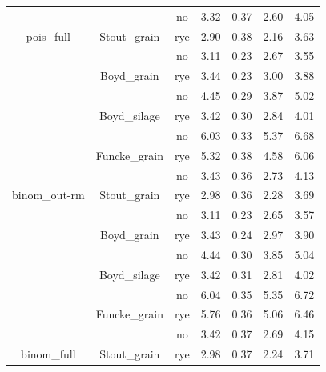 \documentclass[]{article}
\begin{document}
\begin{table}[H]
\begin{tabular}[t]{ccccccc}
\rowcolor{gray!6}   &  & no & 3.32 & 0.37 & 2.60 & 4.05\\

\multirow{-8}{*}{\centering\arraybackslash pois\_full} & \multirow{-2}{*}{\centering\arraybackslash Stout\_grain} & rye & 2.90 & 0.38 & 2.16 & 3.63\\
\cmidrule{1-7}
\rowcolor{gray!6}   &  & no & 3.11 & 0.23 & 2.67 & 3.55\\

 & \multirow{-2}{*}{\centering\arraybackslash Boyd\_grain} & rye & 3.44 & 0.23 & 3.00 & 3.88\\

\rowcolor{gray!6}   &  & no & 4.45 & 0.29 & 3.87 & 5.02\\

 & \multirow{-2}{*}{\centering\arraybackslash Boyd\_silage} & rye & 3.42 & 0.30 & 2.84 & 4.01\\

\rowcolor{gray!6}   &  & no & 6.03 & 0.33 & 5.37 & 6.68\\

 & \multirow{-2}{*}{\centering\arraybackslash Funcke\_grain} & rye & 5.32 & 0.38 & 4.58 & 6.06\\

\rowcolor{gray!6}   &  & no & 3.43 & 0.36 & 2.73 & 4.13\\

\multirow{-8}{*}{\centering\arraybackslash binom\_out-rm} & \multirow{-2}{*}{\centering\arraybackslash Stout\_grain} & rye & 2.98 & 0.36 & 2.28 & 3.69\\
\cmidrule{1-7}
\rowcolor{gray!6}   &  & no & 3.11 & 0.23 & 2.65 & 3.57\\

 & \multirow{-2}{*}{\centering\arraybackslash Boyd\_grain} & rye & 3.43 & 0.24 & 2.97 & 3.90\\

\rowcolor{gray!6}   &  & no & 4.44 & 0.30 & 3.85 & 5.04\\

 & \multirow{-2}{*}{\centering\arraybackslash Boyd\_silage} & rye & 3.42 & 0.31 & 2.81 & 4.02\\

\rowcolor{gray!6}   &  & no & 6.04 & 0.35 & 5.35 & 6.72\\

 & \multirow{-2}{*}{\centering\arraybackslash Funcke\_grain} & rye & 5.76 & 0.36 & 5.06 & 6.46\\

\rowcolor{gray!6}   &  & no & 3.42 & 0.37 & 2.69 & 4.15\\

\multirow{-8}{*}{\centering\arraybackslash binom\_full} & \multirow{-2}{*}{\centering\arraybackslash Stout\_grain} & rye & 2.98 & 0.37 & 2.24 & 3.71\\
\bottomrule
\end{tabular}
\end{table}
\end{document}
